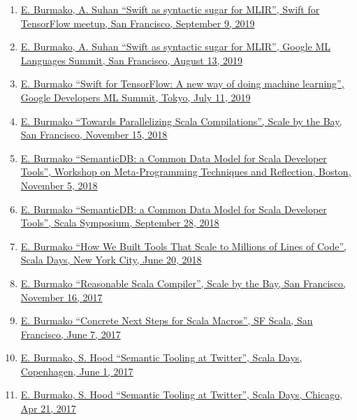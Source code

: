 \documentclass[margin, 10pt]{Stylesheet}
\begin{document}
\begin{resume}
\begin{enumerate} \itemsep -2pt
\item \href{https://www.meetup.com/Swift-for-TensorFlow/events/262262835/}{E. Burmako, A. Suhan ``Swift as syntactic sugar for MLIR'', Swift for TensorFlow meetup, San Francisco, September 9, 2019}
\item \href{https://docs.google.com/presentation/d/1cJQPJMTa7IJqCpJf4WpVM_UpiSivsmfnsMbBmodNh3M/edit#slide=id.g5dc464bf19_0_98}{E. Burmako, A. Suhan ``Swift as syntactic sugar for MLIR'', Google ML Languages Summit, San Francisco, August 13, 2019}
\item \href{https://docs.google.com/presentation/d/1WOR288YE4-qgjtPtnb7taK0KrhTFTfMf_e-Vvv29vbE/edit}{E. Burmako ``Swift for TensorFlow: A new way of doing machine learning'', Google Developers ML Summit, Tokyo, July 11, 2019}
\item \href{https://github.com/twitter/rsc/raw/master/docs/2018-11-15-ScaleByTheBay.pdf}{E. Burmako ``Towards Parallelizing Scala Compilations'', Scale by the Bay, San Francisco, November 15, 2018}
\item \href{https://2018.splashcon.org/track/meta-2018#About}{E. Burmako ``SemanticDB: a Common Data Model for Scala Developer Tools'', Workshop on Meta-Programming Techniques and Reflection, Boston, November 5, 2018}
\item \href{https://conf.researchr.org/track/scala-2018/scala-2018-papers#About}{E. Burmako ``SemanticDB: a Common Data Model for Scala Developer Tools'', Scala Symposium, September 28, 2018}
\item \href{http://scalameta.org/talks/2018-06-20-HowWeBuiltToolsThatScaleToMillionsOfLoc.pdf}{E. Burmako ``How We Built Tools That Scale to Millions of Lines of Code'', Scala Days, New York City, June 20, 2018}
\item \href{https://github.com/twitter/rsc/raw/master/docs/2017-11-16-ScaleByTheBay.pdf}{E. Burmako ``Reasonable Scala Compiler'', Scale by the Bay, San Francisco, November 16, 2017}
\item \href{http://scalamacros.org/paperstalks/2017-06-07-ConcreteNextSteps.pdf}{E. Burmako ``Concrete Next Steps for Scala Macros'', SF Scala, San Francisco, June 7, 2017}
\item \href{http://scalameta.org/talks/2017-06-01-SemanticToolingAtTwitter.pdf}{E. Burmako, S. Hood ``Semantic Tooling at Twitter'', Scala Days, Copenhagen, June 1, 2017}
\item \href{http://scalameta.org/talks/2017-06-01-SemanticToolingAtTwitter.pdf}{E. Burmako, S. Hood ``Semantic Tooling at Twitter'', Scala Days, Chicago, Apr 21, 2017}

\end{enumerate}
\end{resume}
\end{document}
